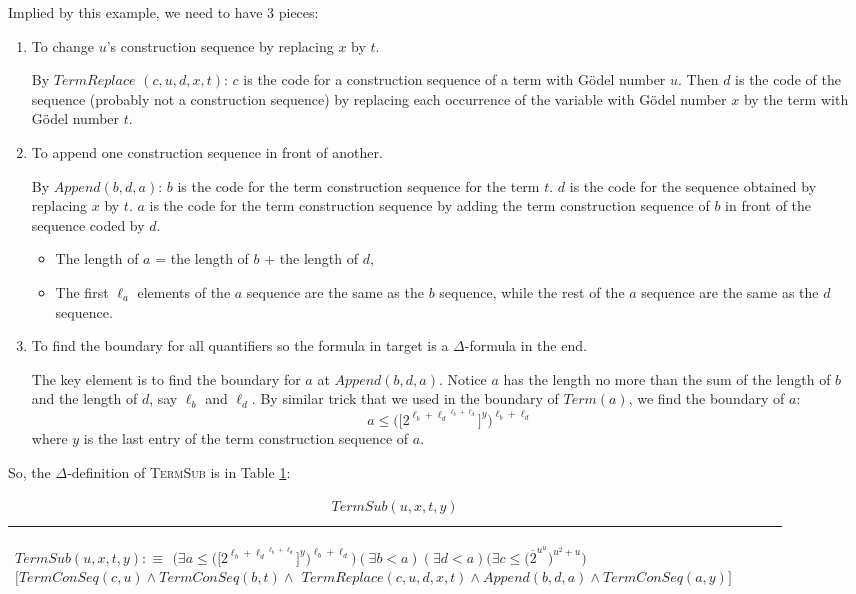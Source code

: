 \documentclass[11pt,letterpaper]{book}
\theoremstyle{definition}
\begin{document}
Implied by this example, we need to have 3 pieces:
\begin{enumerate}
\item{To change $u$'s construction sequence by replacing $x$ by $t$.

By $TermReplace$ $(c, u, d, x, t)$: $c$ is the code for a construction sequence of a term with G\"odel number $u$. Then $d$ is the code of the sequence (probably not a construction sequence) by replacing each occurrence of the variable with G\"odel number $x$ by the term with G\"odel number $t$.
}
\item{To append one construction sequence in front of another.

By $Append(b, d, a)$: $b$ is the code for the term construction sequence for the term $t$. $d$ is the code for the sequence obtained by replacing $x$ by $t$. $a$ is the code for the term construction sequence by adding the term construction sequence of $b$ in front of the sequence coded by $d$.
\begin{itemize}
\item{The length of $a$ = the length of $b$ + the length of $d$,}
\item{The first $\ell_a$ elements of the $a$ sequence are the same as the $b$ sequence, while the rest of the $a$ sequence are the same as the $d$ sequence.}
\end{itemize}

}
\item{To find the boundary for all quantifiers so the formula in target is a $\Delta$-formula in the end.

The key element is to find the boundary for $a$ at $Append(b, d , a)$. Notice $a$ has the length no more than the sum of the length of $b$ and  the length of $d$, say $\ell_b$ and $\ell_d$. By similar trick that we used in the boundary of $Term(a)$, we find the boundary of $a$:
\begin{equation}
a \leq \bigg( \big[ 2^{{\ell_b + \ell_d}^{\ell_b + \ell_d} } \big]^{y} \bigg)^{\ell_b + \ell_d} \nonumber
\end{equation}
where $y$ is the last entry of the term construction sequence of $a$.
}
\end{enumerate}

So, the $\Delta$-definition of \textsc{TermSub} is in Table \ref{box:term_sub}:


\begin{table}[h]
\caption{$TermSub(u, x, t, y)$}
\label{box:term_sub}
\begin{tabular}{|p{0.9\linewidth}|}
\hline
\rule{0pt}{3ex}
\begin{center}
$TermSub(u, x, t, y) : \equiv $
$ \bigg( \exists a \leq \bigg( \big[ 2^{{\ell_b + \ell_d}^{\ell_b + \ell_d} } \big]^{y} \bigg)^{\ell_b + \ell_d} \bigg) (\exists b < a) (\exists d < a) \bigg( \exists c \leq \big( \overline{2}^{u^u} \big)^{u^{\overline{2}} + u}  \bigg)  $
$ \bigg[ TermConSeq(c, u) \land TermConSeq(b, t) \land $
$TermReplace(c, u, d, x, t) \land Append(b, d, a) \land TermConSeq(a, y) \bigg] $
\end{center}\\
\hline
\end{tabular}
\end{table}
\end{document}
